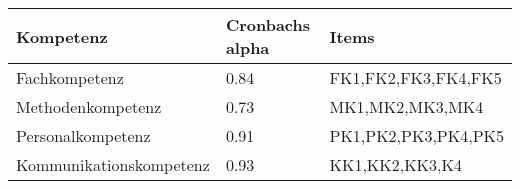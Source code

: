 \begin{table}[H]
\centering
\begin{tabular}{@{}lll@{}}
\toprule
Kompetenz               & Cronbachs alpha & Items               \\ \midrule
Fachkompetenz           & 0.84            & FK1,FK2,FK3,FK4,FK5 \\
Methodenkompetenz       & 0.73            & MK1,MK2,MK3,MK4     \\
Personalkompetenz       & 0.91            & PK1,PK2,PK3,PK4,PK5 \\
Kommunikationskompetenz & 0.93            & KK1,KK2,KK3,K4      \\ \bottomrule
\end{tabular}
\end{table}